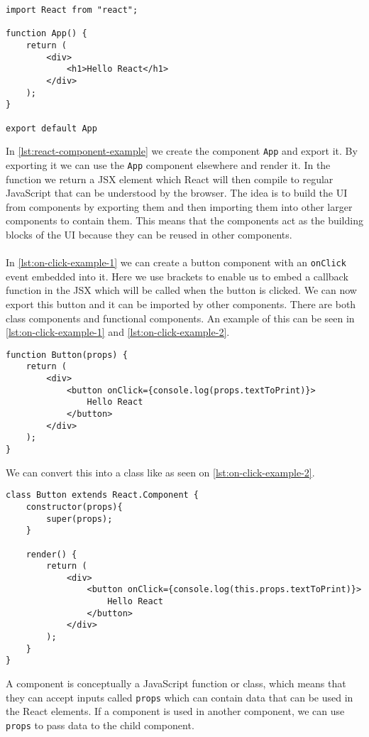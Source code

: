 \begin{lstlisting}[caption={React component example}, captionpos=b, label={lst:react-component-example}]
import React from "react";

function App() {
    return (
        <div>
            <h1>Hello React</h1>
        </div>
    );
}

export default App
\end{lstlisting}
In \autoref{lst:react-component-example} we create the component \texttt{App} and export it.
By exporting it we can use the \texttt{App} component elsewhere and render it.
In the function we return a JSX element which React will then compile to regular JavaScript that can be understood by the browser.
The idea is to build the UI from components by exporting them and then importing them into other larger components to contain them.
This means that the components act as the building blocks of the UI because they can be reused in other components.
\\\\
In \autoref{lst:on-click-example-1} we can create a button component with an \texttt{onClick} event embedded into it.
Here we use brackets to enable us to embed a callback function in the JSX which will be called when the button is clicked.
We can now export this button and it can be imported by other components.
There are both class components and functional components.
An example of this can be seen in \autoref{lst:on-click-example-1} and \autoref{lst:on-click-example-2}.

\begin{lstlisting}[caption={Example of a button with a onClick event in a functional component},label={lst:on-click-example-1}, captionpos=b]
function Button(props) {
	return (
		<div>
			<button onClick={console.log(props.textToPrint)}>
				Hello React
			</button>
		</div>
	);
}
\end{lstlisting}

We can convert this into a class like as seen on \autoref{lst:on-click-example-2}.

\begin{lstlisting}[caption={Example of a button with a onClick event in a class component},label={lst:on-click-example-2}, captionpos=b]
class Button extends React.Component {
	constructor(props){
		super(props);
	}

	render() {
		return (
			<div>
				<button onClick={console.log(this.props.textToPrint)}>
					Hello React
				</button>
			</div>
		);
	}
}
\end{lstlisting}
A component is conceptually a JavaScript function or class, which means that they can accept inputs called \texttt{props} which can contain data that can be used in the React elements.
If a component is used in another component, we can use \texttt{props} to pass data to the child component.
